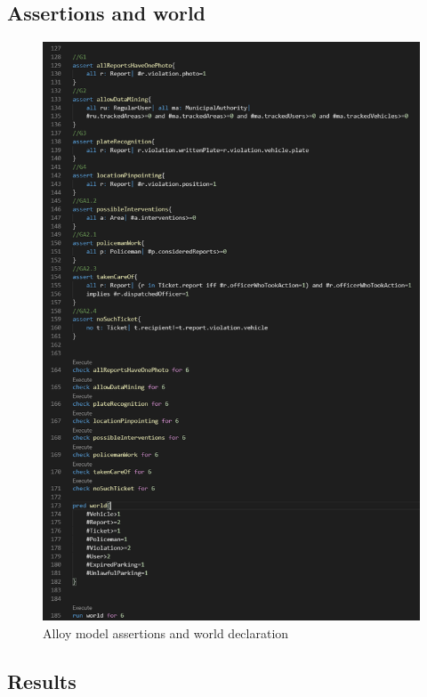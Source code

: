 \subsection{Assertions and world}
\begin{figure}[h!]
	\includegraphics[scale=0.60]{Images/Assertions_and_world}
	\caption{Alloy model assertions and world declaration}
\end{figure}
\newpage
\subsection{Results}
